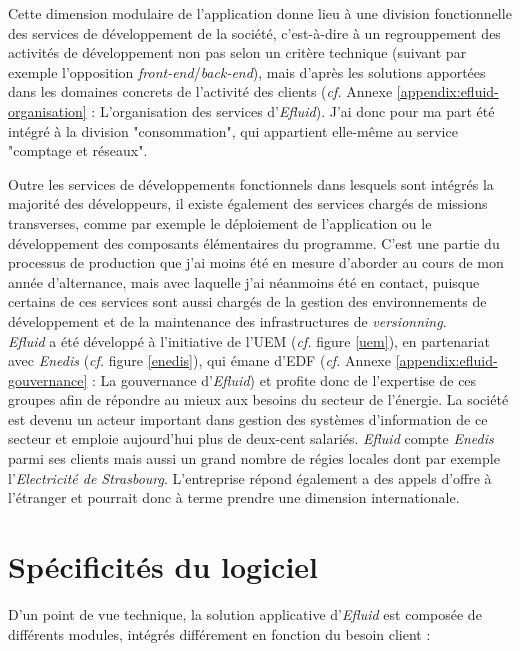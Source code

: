 \documentclass[a4paper, 12pt]{report}
\begin{document}
Cette dimension modulaire de l'application donne lieu à une division fonctionnelle des services de développement de la société, c'est-à-dire à un regrouppement des activités de développement non pas selon un critère technique (suivant par exemple l'opposition \textit{front-end}/\textit{back-end}), mais d'après les solutions apportées dans les domaines concrets de l'activité des clients (\textit{cf.} Annexe \ref{appendix:efluid-organisation} : L'organisation des services d'\textit{Efluid}). J'ai donc pour ma part été intégré à la division "consommation", qui appartient elle-même au service "comptage et réseaux". 

Outre les services de développements fonctionnels dans lesquels sont intégrés la majorité des développeurs, il existe également des services chargés de missions transverses, comme par exemple le déploiement de l'application ou le développement des composants élémentaires du programme. C'est une partie du processus de production que j'ai moins été en mesure d'aborder au cours de mon année d'alternance, mais avec laquelle j'ai néanmoins été en contact, puisque certains de ces services sont aussi chargés de la gestion des environnements de développement et de la maintenance des infrastructures de \textit{versionning}.\\

\textit{Efluid} a été développé à l'initiative de l'UEM (\textit{cf.} figure \ref{uem}), en partenariat avec \textit{Enedis} (\textit{cf.} figure \ref{enedis}), qui émane d'EDF (\textit{cf.} Annexe \ref{appendix:efluid-gouvernance} : La gouvernance d'\textit{Efluid}) et profite donc de l'expertise de ces groupes afin de répondre au mieux aux besoins du secteur de l'énergie. La société est devenu un acteur important dans gestion des systèmes d'information de ce secteur et emploie aujourd'hui plus de deux-cent salariés. \textit{Efluid} compte \textit{Enedis} parmi ses clients mais aussi un grand nombre de régies locales dont par exemple l'\textit{Electricité de Strasbourg}. L'entreprise répond également a des appels d'offre à l'étranger et pourrait donc à terme prendre une dimension internationale.

\section{Spécificités du logiciel}

D'un point de vue technique, la solution applicative d'\textit{Efluid} est composée de différents modules, intégrés différement en fonction du besoin client :\\
\end{document}
